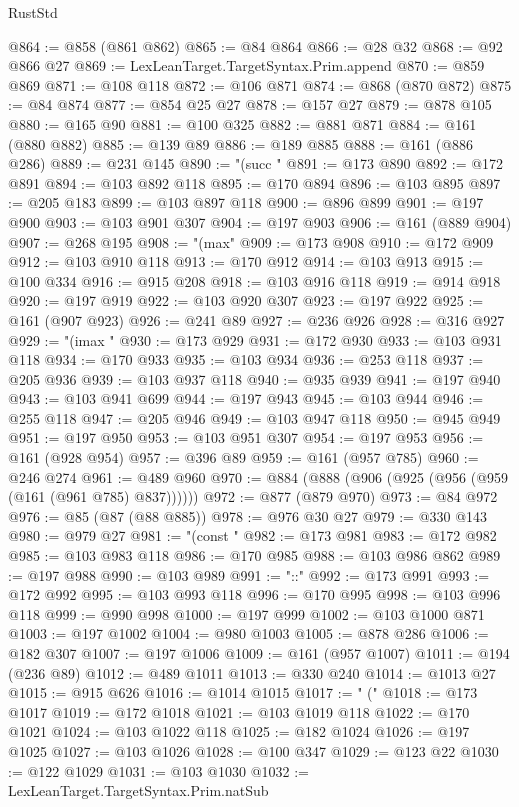\begin{lexlean}{RustStd}
\begin{coremodule}
@864 := @858 (@861 @862)
@865 := @84 @864
@866 := @28 @32
@868 := @92 @866 @27
@869 := LexLeanTarget.TargetSyntax.Prim.append
@870 := @859 @869
@871 := @108 @118
@872 := @106 @871
@874 := @868 (@870 @872)
@875 := @84 @874
@877 := @854 @25 @27
@878 := @157 @27
@879 := @878 @105
@880 := @165 @90
@881 := @100 @325
@882 := @881 @871
@884 := @161 (@880 @882)
@885 := @139 @89
@886 := @189 @885
@888 := @161 (@886 @286)
@889 := @231 @145
@890 := "(succ "
@891 := @173 @890
@892 := @172 @891
@894 := @103 @892 @118
@895 := @170 @894
@896 := @103 @895
@897 := @205 @183
@899 := @103 @897 @118
@900 := @896 @899
@901 := @197 @900
@903 := @103 @901 @307
@904 := @197 @903
@906 := @161 (@889 @904)
@907 := @268 @195
@908 := "(max"
@909 := @173 @908
@910 := @172 @909
@912 := @103 @910 @118
@913 := @170 @912
@914 := @103 @913
@915 := @100 @334
@916 := @915 @208
@918 := @103 @916 @118
@919 := @914 @918
@920 := @197 @919
@922 := @103 @920 @307
@923 := @197 @922
@925 := @161 (@907 @923)
@926 := @241 @89
@927 := @236 @926
@928 := @316 @927
@929 := "(imax "
@930 := @173 @929
@931 := @172 @930
@933 := @103 @931 @118
@934 := @170 @933
@935 := @103 @934
@936 := @253 @118
@937 := @205 @936
@939 := @103 @937 @118
@940 := @935 @939
@941 := @197 @940
@943 := @103 @941 @699
@944 := @197 @943
@945 := @103 @944
@946 := @255 @118
@947 := @205 @946
@949 := @103 @947 @118
@950 := @945 @949
@951 := @197 @950
@953 := @103 @951 @307
@954 := @197 @953
@956 := @161 (@928 @954)
@957 := @396 @89
@959 := @161 (@957 @785)
@960 := @246 @274
@961 := @489 @960
@970 := @884 (@888 (@906 (@925 (@956 (@959 (@161 (@961 @785) @837))))))
@972 := @877 (@879 @970)
@973 := @84 @972
@976 := @85 (@87 (@88 @885))
@978 := @976 @30 @27
@979 := @330 @143
@980 := @979 @27
@981 := "(const "
@982 := @173 @981
@983 := @172 @982
@985 := @103 @983 @118
@986 := @170 @985
@988 := @103 @986 @862
@989 := @197 @988
@990 := @103 @989
@991 := "::"
@992 := @173 @991
@993 := @172 @992
@995 := @103 @993 @118
@996 := @170 @995
@998 := @103 @996 @118
@999 := @990 @998
@1000 := @197 @999
@1002 := @103 @1000 @871
@1003 := @197 @1002
@1004 := @980 @1003
@1005 := @878 @286
@1006 := @182 @307
@1007 := @197 @1006
@1009 := @161 (@957 @1007)
@1011 := @194 (@236 @89)
@1012 := @489 @1011
@1013 := @330 @240
@1014 := @1013 @27
@1015 := @915 @626
@1016 := @1014 @1015
@1017 := " ("
@1018 := @173 @1017
@1019 := @172 @1018
@1021 := @103 @1019 @118
@1022 := @170 @1021
@1024 := @103 @1022 @118
@1025 := @182 @1024
@1026 := @197 @1025
@1027 := @103 @1026
@1028 := @100 @347
@1029 := @123 @22
@1030 := @122 @1029
@1031 := @103 @1030
@1032 := LexLeanTarget.TargetSyntax.Prim.natSub

\end{coremodule}
\end{lexlean}
